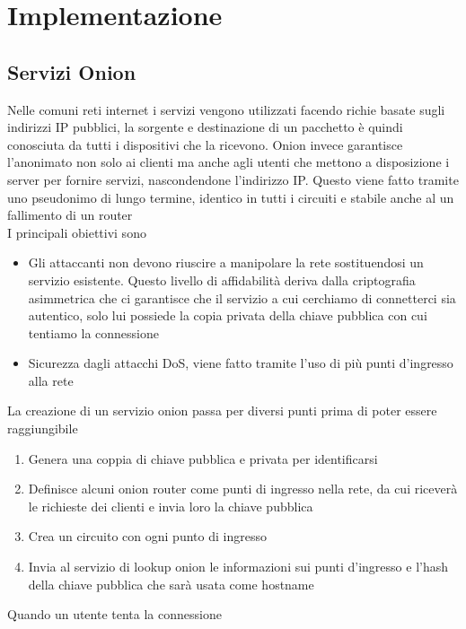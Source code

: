 \chapter{Implementazione}

\section{Servizi Onion}
Nelle comuni reti internet i servizi vengono utilizzati facendo richie basate sugli indirizzi IP pubblici, la sorgente e destinazione di un pacchetto è quindi conosciuta da tutti i dispositivi che la ricevono. 
Onion invece garantisce l'anonimato non solo ai clienti ma anche agli utenti che mettono a disposizione i server per fornire servizi, nascondendone l'indirizzo IP. 
Questo viene fatto tramite uno pseudonimo di lungo termine, identico in tutti i circuiti e stabile anche al un fallimento di un router \\
I principali obiettivi sono
\begin{itemize}
    \item Gli attaccanti non devono riuscire a manipolare la rete sostituendosi un servizio esistente. Questo livello di affidabilità deriva dalla criptografia asimmetrica che ci garantisce che il servizio a cui cerchiamo di connetterci sia autentico, solo lui possiede la copia privata della chiave pubblica con cui tentiamo la connessione
    \item Sicurezza dagli attacchi DoS, viene fatto tramite l'uso di più punti d'ingresso alla rete 
\end{itemize}
La creazione di un servizio onion passa per diversi punti prima di poter essere raggiungibile
\begin{enumerate}
    \item Genera una coppia di chiave pubblica e privata per identificarsi
    \item Definisce alcuni onion router come punti di ingresso nella rete, da cui riceverà le richieste dei clienti e invia loro la chiave pubblica
    \item Crea un circuito con ogni punto di ingresso
    \item Invia al servizio di lookup onion le informazioni sui punti d'ingresso e l'hash della chiave pubblica che sarà usata come hostname
\end{enumerate}
Quando un utente tenta la connessione
